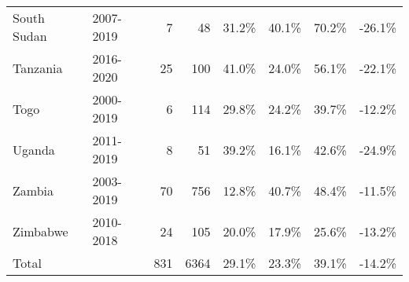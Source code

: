 \begin{table}[ht]
\begin{tabular}{llrrllll}
  South Sudan & 2007-2019 &   7 &  48 & 31.2\% & 40.1\% & 70.2\% & -26.1\% \\ 
  Tanzania & 2016-2020 &  25 & 100 & 41.0\% & 24.0\% & 56.1\% & -22.1\% \\ 
  Togo & 2000-2019 &   6 & 114 & 29.8\% & 24.2\% & 39.7\% & -12.2\% \\ 
  Uganda & 2011-2019 &   8 &  51 & 39.2\% & 16.1\% & 42.6\% & -24.9\% \\ 
  Zambia & 2003-2019 &  70 & 756 & 12.8\% & 40.7\% & 48.4\% & -11.5\% \\ 
  Zimbabwe & 2010-2018 &  24 & 105 & 20.0\% & 17.9\% & 25.6\% & -13.2\% \\ 
  Total &   & 831 & 6364 & 29.1\% & 23.3\% & 39.1\% & -14.2\% \\ 
   \hline
\end{tabular}
\end{table}
